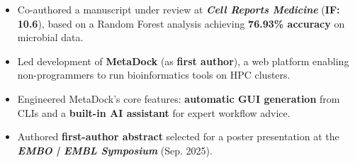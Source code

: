 \documentclass{resume}
\begin{document}
\begin{itemize}
    \item Co-authored a manuscript under review at \textbf{\textit{Cell Reports Medicine}} (\textbf{IF: 10.6}), based on a Random Forest analysis achieving \textbf{76.93\% accuracy} on microbial data.
    \item Led development of \textbf{MetaDock} (as \textbf{first author}), a web platform enabling non-programmers to run bioinformatics tools on HPC clusters.
    \item Engineered MetaDock's core features: \textbf{automatic GUI generation} from CLIs and a \textbf{built-in AI assistant} for expert workflow advice.
    \item Authored \textbf{first-author abstract} selected for a poster presentation at the \textbf{\textit{EMBO | EMBL Symposium}} (Sep. 2025).
\end{itemize}


\end{document}
